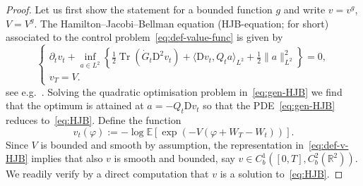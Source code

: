 \documentclass[11pt, a4paper]{scrartcl}
\numberwithin{equation}{section}
\theoremstyle{plain}
\theoremstyle{remark}
\newcommand{\assign}{:=}
\newcommand{\mathD}{\mathrm{D}}
\newcommand{\tmop}[1]{\ensuremath{\operatorname{#1}}}
\begin{document}
\begin{proof}
	Let us first show the statement for a bounded function $g$ and write $v =
		v^g$, $V = V^g$. The Hamilton--Jacobi--Bellman equation (HJB-equation; for
	short) associated to the control problem~\eqref{eq:def-value-func} is given
	by
	\begin{equation}
		\begin{cases}
			\partial_t v_t + \inf_{a \in L^2} \left\{ \frac{1}{2} \tmop{Tr}
			(\dot{G}_t \mathD^2 v_t) + \langle \mathD v_t, Q_t a \rangle_{L^2} +
			\frac{1}{2} \| a \|_{L^2}^2 \right\} = 0, \label{eq:gen-HJB} \\
			v_T = V.
		\end{cases}
	\end{equation}
	see e.g.~{\cite[Section~2.5.1]{fabbriStochasticOptimalControl2017}}. Solving
	the quadratic optimisation problem in~\eqref{eq:gen-HJB} we find that the
	optimum is attained at $a = - Q_t \mathD v_t$ so that the
	PDE~\eqref{eq:gen-HJB} reduces to~\eqref{eq:HJB}. Define the function
	\begin{equation}
		v_t (\varphi) \assign - \log \mathbb{E} [\exp (- V (\varphi + W_T - W_t))]
		. \label{eq:def-v-HJB}
	\end{equation}
	Since $V$ is bounded and smooth by assumption, the representation
	in~\eqref{eq:def-v-HJB} implies that also $v$ is smooth and bounded, say $v
		\in C^1_b ([0, T], C^2_b (\mathbb{R}^2))$. We readily verify by a direct
	computation that $v$ is a solution to~\eqref{eq:HJB}.


\end{proof}
\end{document}
